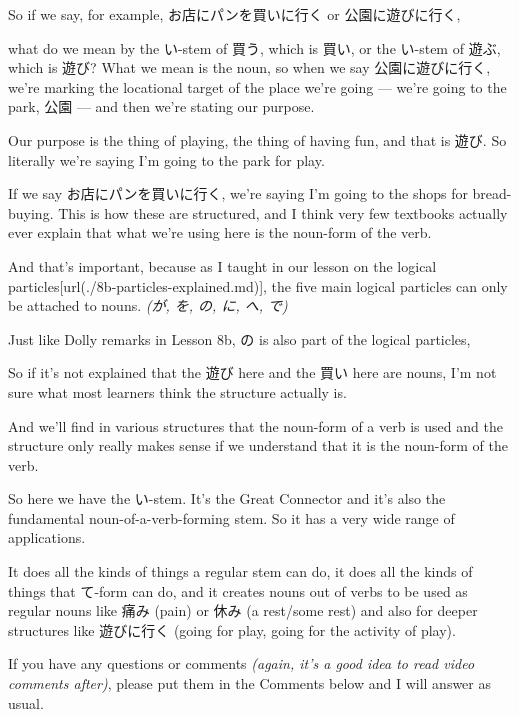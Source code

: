 \thinrule

So if we say, for example, お店にパンを買いに行く or 公園に遊びに行く,

{}

what do we mean by the い-stem of 買う, which is 買い, or the い-stem of 遊ぶ, which is 遊び? What we mean is the noun, so when we say 公園に遊びに行く, we're marking the locational target of the place we're going --- we're going to the park, 公園 --- and then we're stating our purpose.

Our purpose is the thing of playing, the thing of having fun, and that is 遊び. So literally we're saying I'm going to the park for play.

If we say お店にパンを買いに行く, we're saying I'm going to the shops for bread-buying. This is how these are structured, and I think very few textbooks actually ever explain that what we're using here is the noun-form of the verb.

And that's important, because as I taught in our lesson on the logical particles\goto{{[}8b{]}}[url(./8b-particles-explained.md)], the five main logical particles can only be attached to nouns. {\em (が, を, の, に, へ, で)}

Just like Dolly remarks in Lesson 8b, の is also part of the logical particles,

So if it's not explained that the 遊び here and the 買い here are nouns, I'm not sure what most learners think the structure actually is.

\thinrule

And we'll find in various structures that the noun-form of a verb is used and the structure only really makes sense if we understand that it is the noun-form of the verb.

So here we have the い-stem. It's the Great Connector and it's also the fundamental noun-of-a-verb-forming stem. So it has a very wide range of applications.

It does all the kinds of things a regular stem can do, it does all the kinds of things that て-form can do, and it creates nouns out of verbs to be used as regular nouns like 痛み (pain) or 休み (a rest/some rest) and also for deeper structures like 遊びに行く (going for play, going for the activity of play).

If you have any questions or comments {\em (again, it's a good idea to read video comments after)}, please put them in the Comments below and I will answer as usual.

